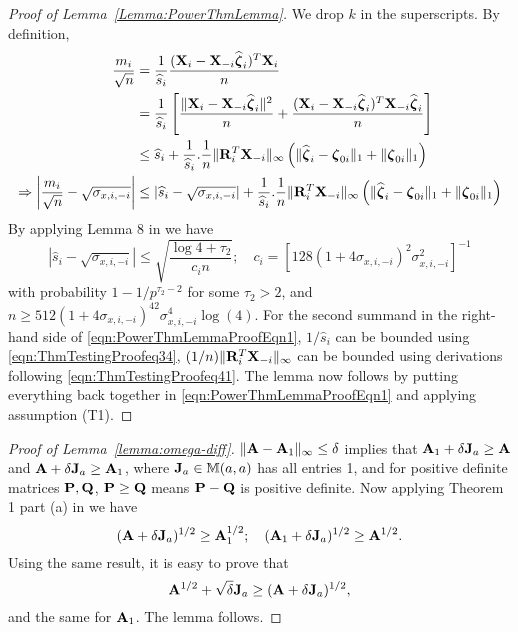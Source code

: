 \begin{proof}[Proof of Lemma~\ref{Lemma:PowerThmLemma}] We drop $k$ in the superscripts. By definition,
\begin{align}
\frac{m_i}{\sqrt n} &= \frac{1}{\widehat s_i} \frac{ ( {\mathbf{X}}_i - {\mathbf{X}}_{-i} \widehat {{\boldsymbol{\zeta}}}_i)^T {\mathbf{X}}_i}{n} \notag\\
&= \frac{1}{\widehat s_i} \left[ \frac{\| {\mathbf{X}}_i - {\mathbf{X}}_{-i} \widehat {{\boldsymbol{\zeta}}}_i \|^2}{n} +
 \frac{({\mathbf{X}}_i - {\mathbf{X}}_{-i} \widehat {{\boldsymbol{\zeta}}}_i)^T {\mathbf{X}}_{-i} \widehat {{\boldsymbol{\zeta}}}_i}{n} \right] \notag\\
& \leq \widehat s_i + \frac{1}{\widehat s_i} .\frac{1}{n} \| {\mathbf{R}}_i^T {\mathbf{X}}_{-i} \|_\infty
\left (\| \widehat {{\boldsymbol{\zeta}}}_i - {\boldsymbol{\zeta}}_{0i} \|_1 + \| {\boldsymbol{\zeta}}_{0i} \|_1 \right) \notag\\
\Rightarrow \left| \frac{m_i}{\sqrt n} - \sqrt{\sigma_{x,i,-i}} \right| & \leq
| \widehat s_i - \sqrt{\sigma_{x,i,-i}} | + \frac{1}{\widehat s_i} .\frac{1}{n} \| {\mathbf{R}}_i^T {\mathbf{X}}_{-i} \|_\infty
\left (\| \widehat {{\boldsymbol{\zeta}}}_i - {\boldsymbol{\zeta}}_{0i} \|_1 + \| {\boldsymbol{\zeta}}_{0i} \|_1 \right) \label{eqn:PowerThmLemmaProofEqn1}
\end{align}
%
By applying Lemma 8 in \cite{RavikumarEtal11} we have
%
$$
| \widehat s_i - \sqrt{\sigma_{x,i,-i}} | \leq \sqrt{ \frac{ \log 4 + \tau_2}{c_i n}}; \quad
c_i = \left[ 128 (1 + 4 \sigma_{x,i,-i})^2 \sigma_{x,i,-i}^2 \right]^{-1}
$$
%
with probability $1 - 1/p^{\tau_2 - 2}$ for some $\tau_2>2$, and $n \geq 512 (1 + 4 \sigma_{x,i,-i})^42 \sigma_{x,i,-i}^4 \log(4) $. For the second summand in the right-hand side of \eqref{eqn:PowerThmLemmaProofEqn1}, $1/\widehat s_i$ can be bounded using \eqref{eqn:ThmTestingProofeq34}, $(1/n) \| {\mathbf{R}}_i^T {\mathbf{X}}_{-i} \|_\infty$ can be bounded using derivations following \eqref{eqn:ThmTestingProofeq41}. The lemma now follows by putting everything back together in \eqref{eqn:PowerThmLemmaProofEqn1} and applying assumption (T1).
\end{proof}

\begin{proof}[Proof of Lemma~\ref{lemma:omega-diff}]
$\| {\mathbf{A}} - {\mathbf{A}}_1 \|_\infty \leq \delta$ implies that ${\mathbf{A}}_1 + \delta {\mathbf{J}}_a \geq {\mathbf{A}}$ and ${\mathbf{A}} + \delta {\mathbf{J}}_a \geq {\mathbf{A}}_1$, where ${\mathbf{J}}_a \in {\mathbb{M}}(a,a)$ has all entries 1, and for positive definite matrices ${\mathbf{P}}, {\mathbf{Q}}$, ${\mathbf{P}} \geq {\mathbf{Q}}$ means ${\mathbf{P}} - {\mathbf{Q}}$ is positive definite. Now applying Theorem 1 part (a) in \cite{Bellman68} we have
%
$$
({\mathbf{A}} + \delta {\mathbf{J}}_a)^{1/2} \geq {\mathbf{A}}_1^{1/2}; \quad
({\mathbf{A}}_1 + \delta {\mathbf{J}}_a)^{1/2} \geq {\mathbf{A}}^{1/2}.
$$
%
Using the same result, it is easy to prove that
%
$$ {\mathbf{A}}^{1/2} + \sqrt \delta {\mathbf{J}}_a \geq ({\mathbf{A}} + \delta {\mathbf{J}}_a)^{1/2}, $$
%
and the same for ${\mathbf{A}}_1$. The lemma follows.
\end{proof}

